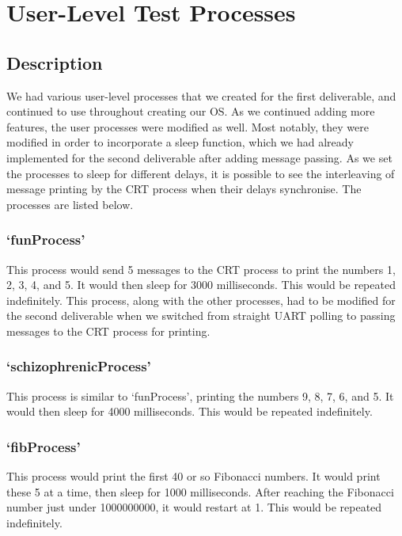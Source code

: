 \documentclass[12pt]{report}
\begin{document}
\chapter{User-Level Test Processes}

\section{Description}

    We had various user-level processes that we created for the first
    deliverable, and continued to use throughout creating our OS.  As we
    continued adding more features, the user processes were modified as well.
    Most notably, they were modified in order to incorporate a sleep function,
    which we had already implemented for the second deliverable after adding
    message passing.  As we set the processes to sleep for different delays, it
    is possible to see the interleaving of message printing by the CRT process
    when their delays synchronise.  The processes are listed below.

\subsection{`funProcess'}

    This process would send 5 messages to the CRT process to print the numbers
    1, 2, 3, 4, and 5.  It would then sleep for 3000 milliseconds.  This would
    be repeated indefinitely.  This process, along with the other processes, had
    to be modified for the second deliverable when we switched from straight
    UART polling to passing messages to the CRT process for printing.

\subsection{`schizophrenicProcess'}

    This process is similar to `funProcess', printing the numbers 9, 8, 7, 6,
    and 5.  It would then sleep for 4000 milliseconds.  This would be repeated
    indefinitely.

\subsection{`fibProcess'}

    This process would print the first 40 or so Fibonacci numbers.  It would
    print these 5 at a time, then sleep for 1000 milliseconds.  After reaching
    the Fibonacci number just under 1000000000, it would restart at 1.  This
    would be repeated indefinitely.
\end{document}
